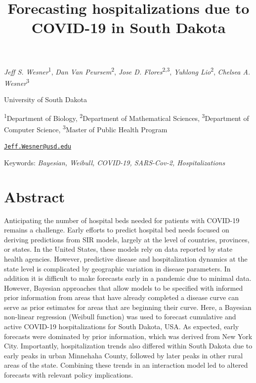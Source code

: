 \documentclass[
]{article}
\title{Forecasting hospitalizations due to COVID-19 in South Dakota}
\author{}
\date{\vspace{-2.5em}}
\begin{document}
\maketitle

\emph{Jeff S. Wesner}\textsuperscript{1}, \emph{Dan Van Peursem}\textsuperscript{2}, \emph{Jose D. Flores}\textsuperscript{2,3}, \emph{Yuhlong Lio}\textsuperscript{2}, \emph{Chelsea A. Wesner}\textsuperscript{3}

University of South Dakota

\textsuperscript{1}Department of Biology, \textsuperscript{2}Department of Mathematical Sciences, \textsuperscript{3}Department of Computer Science, \textsuperscript{3}Master of Public Health Program

\href{mailto:Jeff.Wesner@usd.edu}{\nolinkurl{Jeff.Wesner@usd.edu}}

Keywords: \emph{Bayesian, Weibull, COVID-19, SARS-Cov-2, Hospitalizations}

\hypertarget{abstract}{%
\section{Abstract}\label{abstract}}

Anticipating the number of hospital beds needed for patients with COVID-19 remains a challenge. Early efforts to predict hospital bed needs focused on deriving predictions from SIR models, largely at the level of countries, provinces, or states. In the United States, these models rely on data reported by state health agencies. However, predictive disease and hospitalization dynamics at the state level is complicated by geographic variation in disease parameters. In addition it is difficult to make forecasts early in a pandemic due to minimal data. However, Bayesian approaches that allow models to be specified with informed prior information from areas that have already completed a disease curve can serve as prior estimates for areas that are beginning their curve. Here, a Bayesian non-linear regression (Weibull function) was used to forecast cumulative and active COVID-19 hospitalizations for South Dakota, USA. As expected, early forecasts were dominated by prior information, which was derived from New York City. Importantly, hospitalization trends also differed within South Dakota due to early peaks in urban Minnehaha County, followed by later peaks in other rural areas of the state. Combining these trends in an interaction model led to altered forecasts with relevant policy implications.
\end{document}
